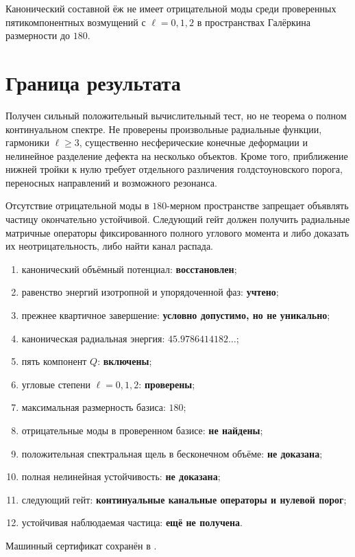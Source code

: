 \begin{proposition}
Канонический составной ёж не имеет отрицательной моды среди проверенных
пятикомпонентных возмущений с $\ell=0,1,2$ в пространствах Галёркина
размерности до $180$.
\end{proposition}

\section{Граница результата}

Получен сильный положительный вычислительный тест, но не теорема о полном
континуальном спектре. Не проверены произвольные радиальные функции,
гармоники $\ell\ge3$, существенно несферические конечные деформации и
нелинейное разделение дефекта на несколько объектов. Кроме того,
приближение нижней тройки к нулю требует отдельного различения
голдстоуновского порога, переносных направлений и возможного резонанса.

\begin{nogocriterion}
Отсутствие отрицательной моды в $180$-мерном пространстве запрещает
объявлять частицу окончательно устойчивой. Следующий гейт должен получить
радиальные матричные операторы фиксированного полного углового момента и
либо доказать их неотрицательность, либо найти канал распада.
\end{nogocriterion}

\begin{protocol}
\begin{enumerate}
 \item канонический объёмный потенциал: \textbf{восстановлен};
 \item равенство энергий изотропной и упорядоченной фаз:
 \textbf{учтено};
 \item прежнее квартичное завершение: \textbf{условно допустимо, но не
 уникально};
 \item каноническая радиальная энергия:
 \textbf{$45.9786414182\ldots$};
 \item пять компонент $Q$: \textbf{включены};
 \item угловые степени $\ell=0,1,2$: \textbf{проверены};
 \item максимальная размерность базиса: \textbf{$180$};
 \item отрицательные моды в проверенном базисе: \textbf{не найдены};
 \item положительная спектральная щель в бесконечном объёме:
 \textbf{не доказана};
 \item полная нелинейная устойчивость: \textbf{не доказана};
 \item следующий гейт: \textbf{континуальные канальные операторы и
 нулевой порог};
 \item устойчивая наблюдаемая частица: \textbf{ещё не получена}.
\end{enumerate}
\end{protocol}

Машинный сертификат сохранён в
.
